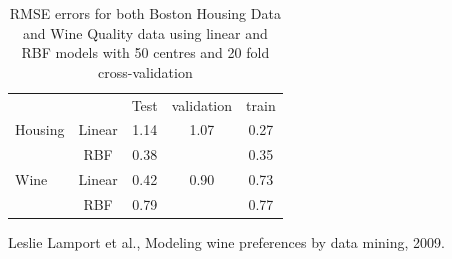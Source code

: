 \documentclass[a4paper,10pt, twocolumn]{article}
\begin{document}
\begin{table}[b]
\begin{tabular}{l c|c|c|c}
	
	&  & Test & validation & train \\
Housing	& Linear & 1.14 & 1.07 & 0.27 \\
	& RBF & 0.38 & & 0.35 \\
Wine& Linear & 0.42 & 0.90 & 0.73 \\
	& RBF & 0.79 & & 0.77 \\
\end{tabular}
\caption{RMSE errors for both Boston Housing Data and Wine Quality data using linear and RBF models with 50 centres and 20 fold cross-validation}
\end{table}
 
\begin{thebibliography}{9}
  Leslie Lamport et al.,
  Modeling wine preferences by data mining, %
  2009.
\end{thebibliography}
\end{document}
